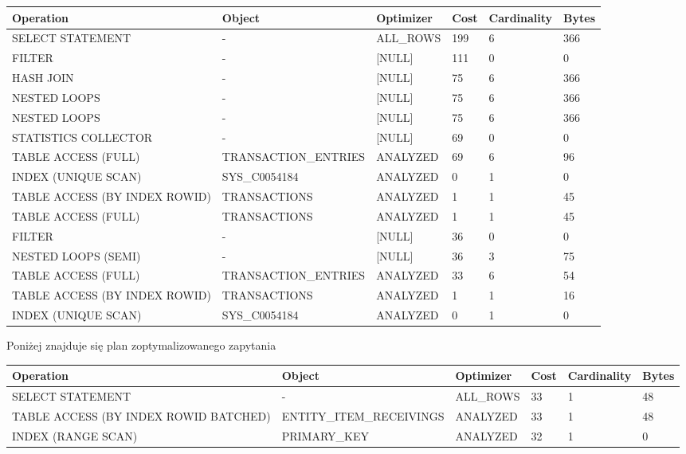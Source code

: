 \documentclass[11pt]{article}
\numberwithin{figure}{subsection}
\begin{document}
		\begin{tabularx}{\textwidth}{|X|X|X|X|X|X|}
Operation&Object&Optimizer&Cost&Cardinality&Bytes\\\hline
SELECT STATEMENT& - &ALL\_ROWS&199&6&366\\\hline
FILTER& - &[NULL]&111&0&0\\\hline
HASH JOIN& - &[NULL]&75&6&366\\\hline
NESTED LOOPS& - &[NULL]&75&6&366\\\hline
NESTED LOOPS& - &[NULL]&75&6&366\\\hline
STATISTICS COLLECTOR& - &[NULL]&69&0&0\\\hline
TABLE ACCESS (FULL)&TRANSACTION\_ENTRIES&ANALYZED&69&6&96\\\hline
INDEX (UNIQUE SCAN)&SYS\_C0054184&ANALYZED&0&1&0\\\hline
TABLE ACCESS (BY INDEX ROWID)&TRANSACTIONS&ANALYZED&1&1&45\\\hline
TABLE ACCESS (FULL)&TRANSACTIONS&ANALYZED&1&1&45\\\hline
FILTER& - &[NULL]&36&0&0\\\hline
NESTED LOOPS (SEMI)& - &[NULL]&36&3&75\\\hline
TABLE ACCESS (FULL)&TRANSACTION\_ENTRIES&ANALYZED&33&6&54\\\hline
TABLE ACCESS (BY INDEX ROWID)&TRANSACTIONS&ANALYZED&1&1&16\\\hline
INDEX (UNIQUE SCAN)&SYS\_C0054184&ANALYZED&0&1&0\\\hline
		\end{tabularx}
		
		Poniżej znajduje się plan zoptymalizowanego zapytania \\
		
		\begin{tabularx}{\textwidth}{|X|X|X|X|X|X|}
Operation&Object&Optimizer&Cost&Cardinality&Bytes\\\hline
SELECT STATEMENT& - &ALL\_ROWS&33&1&48\\\hline
TABLE ACCESS (BY INDEX ROWID BATCHED)&ENTITY\_ITEM\_RECEIVINGS&ANALYZED&33&1&48\\\hline
INDEX (RANGE SCAN)&PRIMARY\_KEY&ANALYZED&32&1&0\\\hline
		\end{tabularx}
	
		
		
		
		
		
		
		
		
		
		
\end{document}
